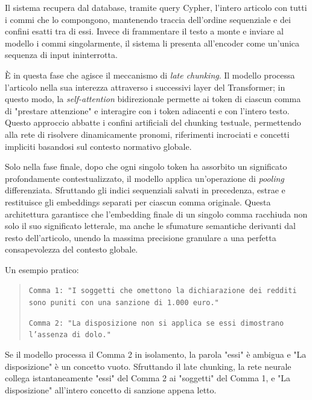 Il sistema recupera dal database, tramite query Cypher, l'intero articolo con tutti i commi che lo compongono, mantenendo traccia dell'ordine sequenziale e dei confini esatti tra di essi. Invece di frammentare il testo a monte e inviare al modello i commi singolarmente, il sistema li presenta all'encoder come un'unica sequenza di input ininterrotta.

È in questa fase che agisce il meccanismo di \textit{late chunking}. Il modello processa l'articolo nella sua interezza attraverso i successivi layer del Transformer; in questo modo, la \textit{self-attention} bidirezionale permette ai token di ciascun comma di "prestare attenzione" e interagire con i token adiacenti e con l'intero testo. Questo approccio abbatte i confini artificiali del chunking testuale, permettendo alla rete di risolvere dinamicamente pronomi, riferimenti incrociati e concetti impliciti basandosi sul contesto normativo globale.

Solo nella fase finale, dopo che ogni singolo token ha assorbito un significato profondamente contestualizzato, il modello applica un'operazione di \textit{pooling} differenziata. Sfruttando gli indici sequenziali salvati in precedenza, estrae e restituisce gli embeddings separati per ciascun comma originale. Questa architettura garantisce che l'embedding finale di un singolo comma racchiuda non solo il suo significato letterale, ma anche le sfumature semantiche derivanti dal resto dell'articolo, unendo la massima precisione granulare a una perfetta consapevolezza del contesto globale.

Un esempio pratico:

\begin{quote}
\texttt{Comma 1: "I soggetti che omettono la dichiarazione dei redditi sono puniti con una sanzione di 1.000 euro."}

\texttt{Comma 2: "La disposizione non si applica se essi dimostrano l'assenza di dolo."}
\end{quote}

Se il modello processa il Comma 2 in isolamento, la parola "essi" è ambigua e "La disposizione" è un concetto vuoto.
Sfruttando il late chunking, la rete neurale collega istantaneamente "essi" del Comma 2 ai "soggetti" del Comma 1, e "La disposizione" all'intero concetto di sanzione appena letto.
